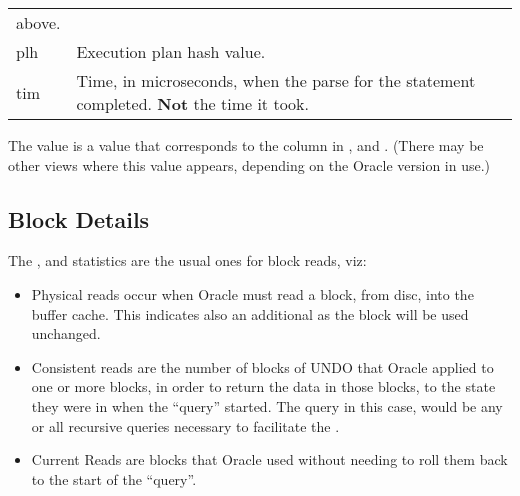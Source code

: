 \begin{longtable}[]{@{}l|l@{}}
\begin{minipage}[t]{0.65\columnwidth}
above.\strut
\end{minipage}\tabularnewline
\begin{minipage}[t]{0.14\columnwidth}\raggedright\strut
plh\strut
\end{minipage} & \begin{minipage}[t]{0.65\columnwidth}\raggedright\strut
Execution plan hash value.\strut
\end{minipage}\tabularnewline
\begin{minipage}[t]{0.14\columnwidth}\raggedright\strut
tim\strut
\end{minipage} & \begin{minipage}[t]{0.65\columnwidth}\raggedright\strut
Time, in microseconds, when the parse for the statement completed.
\textbf{Not} the time it took.\strut
\end{minipage}\tabularnewline
\bottomrule
\end{longtable}

The  value is a value that corresponds to the column  in ,  and . (There may be other views where this value appears, depending on the Oracle version in use.)

\subsection*{Block Details}\label{block-details}


The ,  and  statistics are the usual ones for block reads, viz:

\begin{itemize}
\tightlist
\item
  Physical reads occur when Oracle must read a block, from disc, into   the buffer cache. This indicates also an additional  as the block will be used unchanged.
\item
  Consistent reads are the number of blocks of UNDO that Oracle applied   to one or more blocks, in order to return the data in those blocks, to   the state they were in when the ``query'' started. The query in this   case, would be any or all recursive queries necessary to facilitate   the .
\item
  Current Reads are blocks that Oracle used without needing to roll them   back to the start of the ``query''.
\end{itemize}

